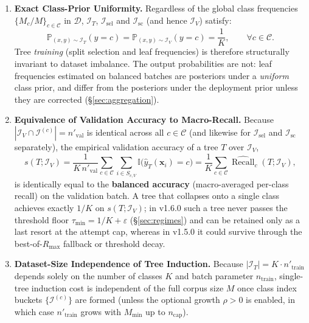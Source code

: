 \documentclass[11pt,a4paper]{article}
\newcommand{\Ind}{\mathbb{I}}
\newcommand{\Prob}{\mathbb{P}}
\DeclareMathOperator{\Recall}{Recall}
\begin{document}
\begin{enumerate}[leftmargin=*, itemsep=4pt]
  \item \textbf{Exact Class-Prior Uniformity.} Regardless of the global class frequencies $\{M_c / M\}_{c \in \mathcal{C}}$ in $\mathcal{D}$, $\mathcal{I}_T$, $\mathcal{I}_{\text{sel}}$ and $\mathcal{I}_{\text{sc}}$ (and hence $\mathcal{I}_V$) satisfy:
  \begin{equation}
    \Prob_{(x, y) \sim \mathcal{I}_{T}}(y = c) = \Prob_{(x, y) \sim \mathcal{I}_{V}}(y = c) = \frac{1}{K}, \qquad \forall c \in \mathcal{C}.
  \end{equation}
  Tree \emph{training} (split selection and leaf frequencies) is therefore structurally invariant to dataset imbalance. The output probabilities are not: leaf frequencies estimated on balanced batches are posteriors under a \emph{uniform} class prior, and differ from the posteriors under the deployment prior unless they are corrected (\S\ref{sec:aggregation}).

  \item \textbf{Equivalence of Validation Accuracy to Macro-Recall.} Because $|\mathcal{I}_V \cap \mathcal{I}^{(c)}| = n'_{\text{val}}$ is identical across all $c \in \mathcal{C}$ (and likewise for $\mathcal{I}_{\text{sel}}$ and $\mathcal{I}_{\text{sc}}$ separately), the empirical validation accuracy of a tree $T$ over $\mathcal{I}_V$,
  \begin{equation}
    s(T; \mathcal{I}_{V})
    = \frac{1}{K\, n'_{\text{val}}} \sum_{c \in \mathcal{C}} \sum_{i \in S_{c,V}} \Ind\!\big(\hat{y}_{T}(\mathbf{x}_{i}) = c\big)
    = \frac{1}{K} \sum_{c \in \mathcal{C}} \widehat{\Recall}_{c}(T; \mathcal{I}_{V}),
  \end{equation}
  is identically equal to the \textbf{balanced accuracy} (macro-averaged per-class recall) on the validation batch. A tree that collapses onto a single class achieves exactly $1/K$ on $s(T; \mathcal{I}_V)$; in v1.6.0 such a tree never passes the threshold floor $\tau_{\min} = 1/K + \varepsilon$ (\S\ref{sec:regimes}) and can be retained only as a last resort at the attempt cap, whereas in v1.5.0 it could survive through the best-of-$R_{\max}$ fallback or threshold decay.

  \item \textbf{Dataset-Size Independence of Tree Induction.} Because $|\mathcal{I}_T| = K \cdot n'_{\text{train}}$ depends solely on the number of classes $K$ and batch parameter $n_{\text{train}}$, single-tree induction cost is independent of the full corpus size $M$ once class index buckets $\{\mathcal{I}^{(c)}\}$ are formed (unless the optional growth $\rho > 0$ is enabled, in which case $n'_{\text{train}}$ grows with $M_{\min}$ up to $n_{\text{cap}}$).
\end{enumerate}
\end{document}
